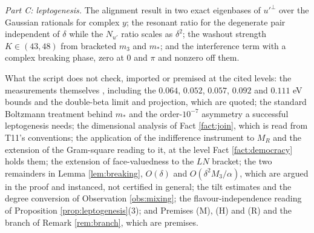 \documentclass[11pt]{article}
\theoremstyle{definition}
\begin{document}
\emph{Part C: leptogenesis.} The alignment result in two exact eigenbases of $u'^{\perp}$ over the Gaussian rationals for complex $y$; the resonant ratio for the degenerate pair independent of $\delta$ while the $N_{u'}$ ratio scales as $\delta^{2}$; the washout strength $K \in (43, 48)$ from bracketed $m_{3}$ and $m_{*}$; and the interference term with a complex breaking phase, zero at $0$ and $\pi$ and nonzero off them.

What the script does not check, imported or premised at the cited levels: the measurements themselves \cite{PDG2024, NuFIT2024, DESI2025, HouWangZhaoZhang2026, T2KNOvA2025, KamLANDZen2023, LEGEND2021}, including the $0.064$, $0.052$, $0.057$, $0.092$ and $0.111$ eV bounds and the double-beta limit and projection, which are quoted; the standard Boltzmann treatment behind $m_{*}$ and the order-$10^{-7}$ asymmetry a successful leptogenesis needs; the dimensional analysis of Fact \ref{fact:join}, which is read from T11's conventions; the application of the indifference instrument to $M_{R}$ and the extension of the Gram-square reading to it, at the level Fact \ref{fact:democracy} holds them; the extension of face-valuedness to the $LN$ bracket; the two remainders in Lemma \ref{lem:breaking}, $O(\delta)$ and $O(\delta^{2}M_{3}/\alpha)$, which are argued in the proof and instanced, not certified in general; the tilt estimates and the degree conversion of Observation \ref{obs:mixing}; the flavour-independence reading of Proposition \ref{prop:leptogenesis}(3); and Premises (M), (H) and (R) and the branch of Remark \ref{rem:branch}, which are premises.
\end{document}
